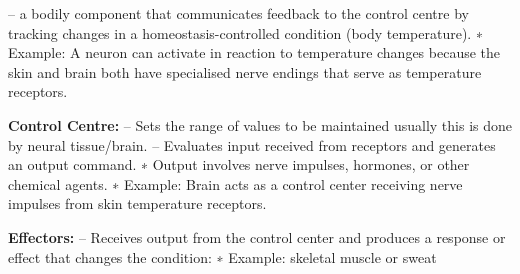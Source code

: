 \documentclass[12pt]{article}
\begin{document}
\newline– a bodily component that communicates feedback to the control centre by tracking changes in a homeostasis-controlled condition (body temperature).
\newline∗ Example: A neuron can activate in reaction to temperature changes because the skin and brain both have specialised nerve endings that serve as temperature receptors.

\item\textbf{Control Centre:}
\newline– Sets the range of values to be maintained usually this is done by
neural tissue/brain.
\newline– Evaluates input received from receptors and generates an output
command.
\newline∗ Output involves nerve impulses, hormones, or other chemical
agents.
\newline∗ Example: Brain acts as a control center receiving nerve impulses
from skin temperature receptors.
\item\textbf{Effectors:}
\newline– Receives output from the control center and produces a response or
effect that changes the condition:
\newline∗ Example: skeletal muscle or sweat
\end{document}
